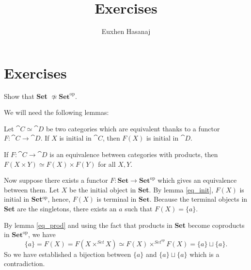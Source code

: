 \documentclass[11pt,a4paper]{article}
\author{Euxhen Hasanaj}
\title{Exercises}
\date{}
\begin{document}
\maketitle

\section{Exercises}
\begin{exercise}
    Show that \textbf{Set} $\not\simeq \textbf{Set}^\text{op}$.
\end{exercise}
\begin{solution}
We will need the following lemmas:
\begin{lemma}\label{eq_init}
    Let $\cat{C}\simeq\cat{D}$ be two categories which are equivalent thanks to a functor $F:\cat{C}\to\cat{D}$. If $X$ is initial in $\cat{C}$, then $F(X)$ is initial in $\cat{D}$.
\end{lemma}
\begin{lemma}\label{eq_prod}
    If $F:\cat{C}\to\cat{D}$ is an equivalence between categories with products, then $F(X\times Y)\simeq F(X)\times F(Y)$ for all $X,Y$.
\end{lemma}
Now suppose there exists a functor $F: \textbf{Set}\to\textbf{Set}^{\text{op}}$ which gives an equivalence between them. Let $X$ be the initial object in \textbf{Set}. By lemma \ref{eq_init}, $F(X)$ is initial in \textbf{Set}$^{\text{op}}$, hence, $F(X)$ is terminal in $\textbf{Set}$. Because the terminal objects in \textbf{Set} are the singletons, there exists an $a$ such that $F(X) = \{a\}$.\par
    By lemma \ref{eq_prod} and using the fact that products in \textbf{Set} become coproducts in $\textbf{Set}^{\text{op}}$, we have
    \begin{equation*}
        \{a\} = F(X) = F(X\times^{Set} X)\simeq F(X)\times^{Set^{op}}F(X) = \{a\}\sqcup\{a\}.
    \end{equation*}
    So we have established a bijection between $\{a\}$ and $\{a\}\sqcup\{a\}$ which is a contradiction.
\end{solution}
\end{document}
